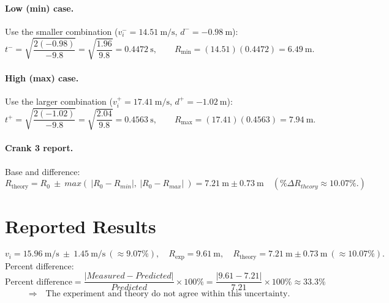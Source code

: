 \documentclass[12pt]{article}
\begin{document}
\paragraph{Low (min) case.}
Use the smaller combination ($v_i^{-}=14.51~\mathrm{m/s}$, $d^{-}=-0.98~\mathrm{m}$):
\[
t^{-}=\sqrt{\frac{2(-0.98)}{-9.8}}=\sqrt{\frac{1.96}{9.8}}=0.4472~\mathrm{s},
\qquad
R_{\min}= (14.51)(0.4472)=\boxed{6.49~\mathrm{m}}.
\]

\paragraph{High (max) case.}
Use the larger combination ($v_i^{+}=17.41~\mathrm{m/s}$, $d^{+}=-1.02~\mathrm{m}$):
\[
t^{+}=\sqrt{\frac{2(-1.02)}{-9.8}}=\sqrt{\frac{2.04}{9.8}}=0.4563~\mathrm{s},
\qquad
R_{\max}= (17.41)(0.4563)=\boxed{7.94~\mathrm{m}}.
\]

\paragraph{Crank 3 report.}
Base and difference:
\[
R_{\text{theory}} = R_{0}\ \pm \  max(\ |R_0 - R_{min}| , \ |R_0 - R_{max}| \ )
= 7.21~\mathrm{m} \pm 0.73~\mathrm{m}
\quad(\%\Delta R_{theory} \approx 10.07\%.)
\]


\newpage
\section{Reported Results}
\[
v_i = 15.96~\mathrm{m/s}\ \pm \ 
1.45~\mathrm{m/s}\ (\approx 9.07\%),
\quad
R_{\exp} = 9.61~\mathrm{m},
\quad
R_{\mathrm{theory}} = 7.21~\mathrm{m} \pm 0.73~\mathrm{m}\ (\approx 10.07\%).
\]
Percent difference:
\[
\text{Percent difference}=\frac{|Measured-Predicted|}{Predicted}\times 100\%=\frac{|9.61 - 7.21|}{7.21} \times 100\% \approx 33.3\% 
\]
\[
\Rightarrow \quad
\text{The experiment and theory do not agree within this uncertainty.}
\]

\newpage
\end{document}

